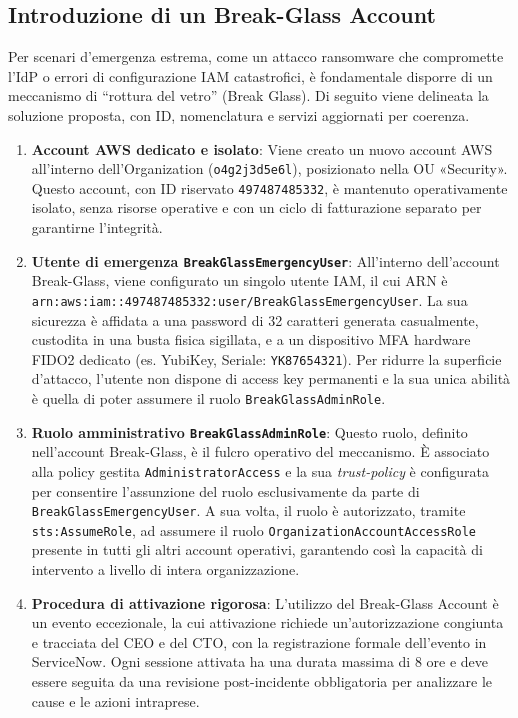 \subsection{Introduzione di un Break-Glass Account}
\label{subsubsec:break_glass_account_iam}

Per scenari d’emergenza estrema, come un attacco ransomware che compromette l'IdP o errori di configurazione IAM catastrofici, è fondamentale disporre di un meccanismo di “rottura del vetro” (Break Glass). Di seguito viene delineata la soluzione proposta, con ID, nomenclatura e servizi aggiornati per coerenza.

\begin{enumerate}
\item \textbf{Account AWS dedicato e isolato}:
Viene creato un nuovo account AWS all'interno dell'Organization (\texttt{o\discretionary{-}{}{-}4g2j3d5e6l}), posizionato nella OU «Security». Questo account, con ID riservato \texttt{497487485332}, è mantenuto operativamente isolato, senza risorse operative e con un ciclo di fatturazione separato per garantirne l'integrità.

\item \textbf{Utente di emergenza \texttt{BreakGlassEmergencyUser}}:
All'interno dell'account Break-Glass, viene configurato un singolo utente IAM, il cui ARN è \texttt{arn:aws:iam::497487485332:user/BreakGlassEmergencyUser}. La sua sicurezza è affidata a una password di 32 caratteri generata casualmente, custodita in una busta fisica sigillata, e a un dispositivo MFA hardware FIDO2 dedicato (es. YubiKey, Seriale: \texttt{YK\discretionary{-}{}{-}87654321}). Per ridurre la superficie d'attacco, l'utente non dispone di access key permanenti e la sua unica abilità è quella di poter assumere il ruolo \texttt{BreakGlassAdminRole}.

\item \textbf{Ruolo amministrativo \texttt{BreakGlassAdminRole}}:
Questo ruolo, definito nell'account Break-Glass, è il fulcro operativo del meccanismo. È associato alla policy gestita \texttt{AdministratorAccess} e la sua \emph{trust-policy} è configurata per consentire l'assunzione del ruolo esclusivamente da parte di \texttt{BreakGlassEmergencyUser}. A sua volta, il ruolo è autorizzato, tramite \texttt{sts:AssumeRole}, ad assumere il ruolo \texttt{OrganizationAccountAccessRole} presente in tutti gli altri account operativi, garantendo così la capacità di intervento a livello di intera organizzazione.

\item \textbf{Procedura di attivazione rigorosa}:
L'utilizzo del Break-Glass Account è un evento eccezionale, la cui attivazione richiede un'autorizzazione congiunta e tracciata del CEO e del CTO, con la registrazione formale dell'evento in ServiceNow. Ogni sessione attivata ha una durata massima di 8 ore e deve essere seguita da una revisione post-incidente obbligatoria per analizzare le cause e le azioni intraprese.


\end{enumerate}
